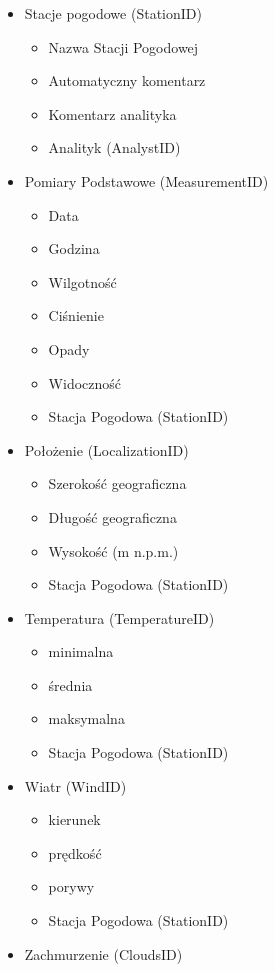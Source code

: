\documentclass[12pt,a4paper]{article}
\begin{document}
\begin{footnotesize}
\begin{itemize}
\item Stacje pogodowe (StationID)
    \begin{itemize}
    \item Nazwa Stacji Pogodowej
    \item Automatyczny komentarz
    \item Komentarz analityka
    \item Analityk (AnalystID)
    \end{itemize}
\item Pomiary Podstawowe (MeasurementID)
    \begin{itemize}
    \item Data
    \item Godzina
    \item Wilgotność
    \item Ciśnienie
    \item Opady
    \item Widoczność
    \item Stacja Pogodowa (StationID)
    \end{itemize}
\item Położenie (LocalizationID)
	\begin{itemize}
	\item Szerokość geograficzna
    \item Długość geograficzna
    \item Wysokość (m n.p.m.)
    \item Stacja Pogodowa (StationID)
	\end{itemize}
\item Temperatura (TemperatureID)
    \begin{itemize}
    \item minimalna
    \item średnia
    \item maksymalna
    \item Stacja Pogodowa (StationID)
    \end{itemize}
\item Wiatr (WindID)
    \begin{itemize}
    \item kierunek
    \item prędkość
    \item porywy
	\item Stacja Pogodowa (StationID)
    \end{itemize}
\item Zachmurzenie (CloudsID)

\end{itemize}
\end{footnotesize}
\end{document}
